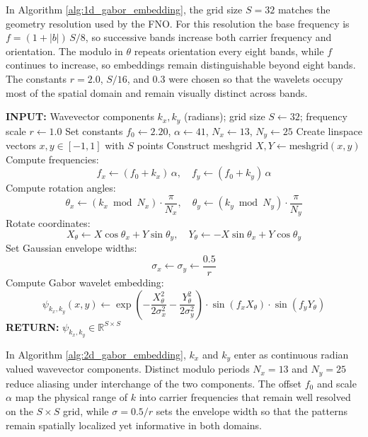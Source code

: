 \documentclass[preprint,review,12pt,numafflabel]{elsarticle}
\begin{document}
In Algorithm \ref{alg:1d_gabor_embedding}, the grid size \(S=32\) matches the geometry resolution used by the FNO. For this resolution the base frequency is \(f=(1+|b|)\,S/8\), so successive bands increase both carrier frequency and orientation. The modulo in \(\theta\) repeats orientation every eight bands, while \(f\) continues to increase, so embeddings remain distinguishable beyond eight bands. The constants \(r=2.0\), \(S/16\), and \(0.3\) were chosen so that the wavelets occupy most of the spatial domain and remain visually distinct across bands.

\begin{algorithm}[H]
\caption{2D Gabor Wavelet Embedding for Wavevectors}
\label{alg:2d_gabor_embedding}
\begin{algorithmic}[1]
\STATE \textbf{INPUT:} Wavevector components \( k_x, k_y \) (radians); grid size \( S \leftarrow 32 \); frequency scale \( r \leftarrow 1.0 \)
\STATE Set constants \( f_0 \leftarrow 2.20 \), \( \alpha \leftarrow 41 \), \( N_x \leftarrow 13 \), \( N_y \leftarrow 25 \)
\STATE Create linspace vectors \( x, y \in [-1, 1] \) with \( S \) points
\STATE Construct meshgrid \( X, Y \leftarrow \text{meshgrid}(x, y) \)
\STATE Compute frequencies:
\[
f_x \leftarrow (f_0 + k_x)\,\alpha, \quad f_y \leftarrow (f_0 + k_y)\,\alpha
\]
\STATE Compute rotation angles:
\[
\theta_x \leftarrow (k_x \bmod N_x) \cdot \frac{\pi}{N_x}, \quad \theta_y \leftarrow (k_y \bmod N_y) \cdot \frac{\pi}{N_y}
\]
\STATE Rotate coordinates:
\[
X_\theta \leftarrow X \cos \theta_x + Y \sin \theta_y, \quad
Y_\theta \leftarrow -X \sin \theta_x + Y \cos \theta_y
\]
\STATE Set Gaussian envelope widths:
\[
\sigma_x \leftarrow \sigma_y \leftarrow \frac{0.5}{r}
\]
\STATE Compute Gabor wavelet embedding:
\[
\psi_{k_x, k_y}(x, y) \leftarrow
\exp\left(-\frac{X_\theta^2}{2 \sigma_x^2} - \frac{Y_\theta^2}{2 \sigma_y^2}\right)
\cdot \sin(f_x X_\theta) \cdot \sin(f_y Y_\theta)
\]
\STATE \textbf{RETURN:} \( \psi_{k_x, k_y} \in \mathbb{R}^{S \times S} \)
\end{algorithmic}
\end{algorithm}

In Algorithm \ref{alg:2d_gabor_embedding}, \(k_x\) and \(k_y\) enter as continuous radian valued wavevector components. Distinct modulo periods \(N_x=13\) and \(N_y=25\) reduce aliasing under interchange of the two components. The offset \(f_0\) and scale \(\alpha\) map the physical range of \(k\) into carrier frequencies that remain well resolved on the \(S\times S\) grid, while \(\sigma=0.5/r\) sets the envelope width so that the patterns remain spatially localized yet informative in both domains.
\end{document}
